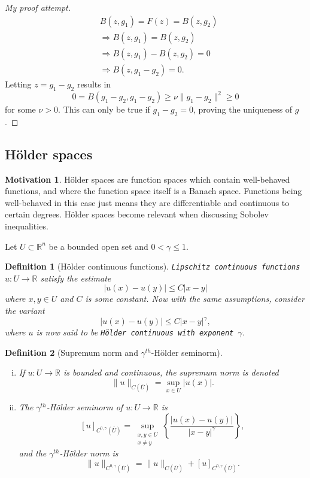 \documentclass[11pt]{article}
\newtheorem{definition}{Definition}
\theoremstyle{definition}
\newtheorem*{motivation}{Motivation}
\begin{document}
\begin{proof}[My proof attempt]
\begin{equation*}
		\begin{aligned}
			&B(z,g_1) = F(z) = B(z,g_2) \\
			&\Rightarrow B(z,g_1) = B(z,g_2) \\
			&\Rightarrow B(z,g_1) - B(z,g_2) = 0 \\
			&\Rightarrow B(z,g_1 - g_2) = 0.
		\end{aligned}
	\end{equation*}
	Letting $z= g_1 - g_2$ results in
	\begin{equation*}
		0 = B(g_1 - g_2, g_1 - g_2) \geq \nu \|g_1 - g_2\|^2 \geq 0
	\end{equation*}
	for some $\nu >0$. This can only be true if $g_1 - g_2 = 0$, proving the uniqueness of $g$.
\end{proof}

\newpage

\subsection{H\"{o}lder spaces}
\begin{motivation}
	H\"{o}lder spaces are function spaces which contain well-behaved functions, and where the function space itself is a Banach space.
	Functions being well-behaved in this case just means they are differentiable and continuous to certain degrees.
	H\"{o}lder spaces become relevant when discussing Sobolev inequalities.
\end{motivation}
Let $U \subset \mathbb{R}^n$ be a bounded open set and $0 < \gamma \leq 1$.
\begin{definition}[H\"{o}lder continuous functions]
\texttt{Lipschitz continuous functions} $u : U \rightarrow \mathbb{R}$
satisfy the estimate
\[|u(x) - u(y)| \leq C|x-y|\]
where $x,y \in U$ and $C$ is some constant.
Now with the same assumptions, consider the variant
\[|u(x) - u(y)| \leq C|x-y|^{\gamma},\]
where $u$ is now said to be \texttt{H\"{o}lder continuous with exponent $\gamma$}.
\end{definition}

\begin{definition}[Supremum norm and $\gamma^{th}$-H\"{o}lder seminorm]~ 
\begin{enumerate}[(i)]
\item If $u : U \rightarrow \mathbb{R}$ is bounded and continuous, the supremum norm is denoted
\[\|u\|_{C(\overline{U})} = \sup_{x \in U}{|u(x)|}.\]

\item The $\gamma^{th}$-H\"{o}lder seminorm of $u : U \rightarrow \mathbb{R}$ is
\[[u]_{C^{0,\gamma}(\overline{U})} = \sup_{\substack{x,y\in U \\ x\not= y}}\left\{\frac{|u(x) - u(y)|}{|x-y|^{\gamma}}\right\},\]
and the $\gamma^{th}$-H\"{o}lder norm is
\[\|u\|_{C^{0,\gamma}(\overline{U})} = \|u\|_{C(\overline{U})} + [u]_{C^{0,\gamma}(\overline{U})}.\]
\end{enumerate}
\end{definition}
\end{document}
